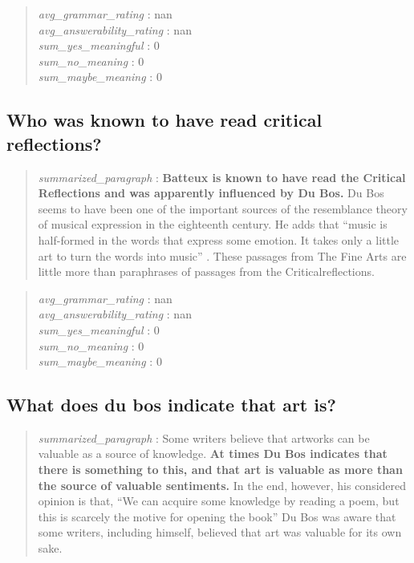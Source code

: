 \begin{quote}
\emph{avg\_grammar\_rating} : nan\\
\emph{avg\_answerability\_rating} : nan\\
\emph{sum\_yes\_meaningful} : 0\\
\emph{sum\_no\_meaning} : 0\\
\emph{sum\_maybe\_meaning} : 0
\end{quote}

\hypertarget{who-was-known-to-have-read-critical-reflections}{%
\subsection{Who was known to have read critical
reflections?}\label{who-was-known-to-have-read-critical-reflections}}

\begin{quote}
\emph{summarized\_paragraph} : \textbf{Batteux is known to have read the
Critical Reflections and was apparently influenced by Du Bos.} Du Bos
seems to have been one of the important sources of the resemblance
theory of musical expression in the eighteenth century. He adds that
``music is half-formed in the words that express some emotion. It takes
only a little art to turn the words into music'' . These passages from
The Fine Arts are little more than paraphrases of passages from the
Criticalreflections.
\end{quote}

\begin{quote}
\emph{avg\_grammar\_rating} : nan\\
\emph{avg\_answerability\_rating} : nan\\
\emph{sum\_yes\_meaningful} : 0\\
\emph{sum\_no\_meaning} : 0\\
\emph{sum\_maybe\_meaning} : 0
\end{quote}

\hypertarget{what-does-du-bos-indicate-that-art-is}{%
\subsection{What does du bos indicate that art
is?}\label{what-does-du-bos-indicate-that-art-is}}

\begin{quote}
\emph{summarized\_paragraph} : Some writers believe that artworks can be
valuable as a source of knowledge. \textbf{At times Du Bos indicates
that there is something to this, and that art is valuable as more than
the source of valuable sentiments.} In the end, however, his considered
opinion is that, ``We can acquire some knowledge by reading a poem, but
this is scarcely the motive for opening the book'' Du Bos was aware that
some writers, including himself, believed that art was valuable for its
own sake.
\end{quote}

